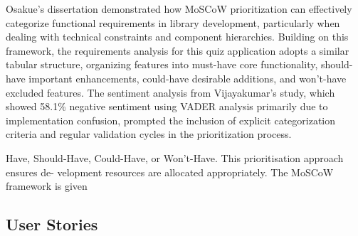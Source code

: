Osakue's dissertation demonstrated how MoSCoW prioritization can effectively categorize functional requirements in library development, 
particularly when dealing with technical constraints and component hierarchies. 
Building on this framework, the requirements analysis for this quiz application adopts a similar tabular structure, organizing features into must-have core functionality, should-have important enhancements, could-have desirable additions, and won't-have excluded features. 
The sentiment analysis from Vijayakumar's study, which showed 58.1\% negative sentiment using VADER analysis primarily due to implementation confusion, prompted the inclusion of explicit categorization criteria and regular validation cycles in the prioritization process.


Have, Should-Have, Could-Have, or Won’t-Have. This prioritisation approach ensures de-
velopment resources are allocated appropriately. The MoSCoW framework is given




\subsection{User Stories}


